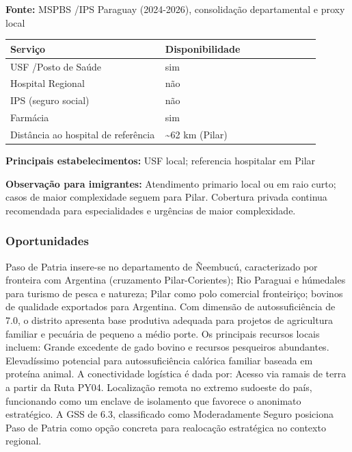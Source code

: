 \textbf{Fonte:} MSPBS /\allowbreak  IPS Paraguay (2024-2026), consolidação
departamental e proxy local

{\def\LTcaptype{none} %
\begin{longtable}{@{}>{\raggedright\arraybackslash}p{0.45\linewidth} >{\raggedright\arraybackslash}p{0.45\linewidth}@{}}
\toprule\noalign{}
Serviço & Disponibilidade \\
\midrule\noalign{}
\endhead
\bottomrule\noalign{}
\endlastfoot
USF /\allowbreak  Posto de Saúde & sim \\
Hospital Regional & não \\
IPS (seguro social) & não \\
Farmácia & sim \\
Distância ao hospital de referência & \textasciitilde62 km (Pilar) \\
\end{longtable}
}

\textbf{Principais estabelecimentos:} USF local; referencia hospitalar
em Pilar

\textbf{Observação para imigrantes:} Atendimento primario local ou em
raio curto; casos de maior complexidade seguem para Pilar. Cobertura
privada continua recomendada para especialidades e urgências de maior
complexidade.
\newpage

\subsubsection*{Oportunidades}\label{oport-paso-de-patria-1211}
Paso de Patria insere-se no departamento de Ñeembucú, caracterizado por fronteira com Argentina (cruzamento Pilar-Corientes); Rio Paraguai e húmedales para turismo de pesca e natureza; Pilar como polo comercial fronteiriço; bovinos de qualidade exportados para Argentina. Com dimensão de autossuficiência de 7.0, o distrito apresenta base produtiva adequada para projetos de agricultura familiar e pecuária de pequeno a médio porte. Os principais recursos locais incluem: Grande excedente de gado bovino e recursos pesqueiros abundantes. Elevadíssimo potencial para autossuficiência calórica familiar baseada em proteína animal. A conectividade logística é dada por: Acesso via ramais de terra a partir da Ruta PY04. Localização remota no extremo sudoeste do país, funcionando como um enclave de isolamento que favorece o anonimato estratégico. A GSS de 6.3, classificado como Moderadamente Seguro posiciona Paso de Patria como opção concreta para realocação estratégica no contexto regional.

